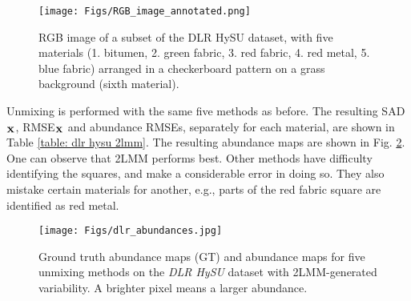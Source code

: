\begin{figure}[t]
    \centering
    \texttt{[image: Figs/RGB\_image\_annotated.png]}
    \caption{RGB image of a subset of the DLR HySU dataset, with five materials (1. bitumen, 2. green fabric, 3. red fabric, 4. red metal, 5. blue fabric) arranged in a checkerboard pattern on a grass background (sixth material).}
    \label{fig:dlr rgb}
\end{figure}

Unmixing is performed with the same five methods as before. The resulting SAD$_{\mathbf{X}}$, RMSE$_{\mathbf{X}}$ and abundance RMSEs, separately for each material, are shown in Table \ref{table: dlr hysu 2lmm}. The resulting abundance maps are shown in Fig. \ref{fig: dlr hysu abundances}. One can observe that 2LMM performs best. Other methods have difficulty identifying the squares, and make a considerable error in doing so. They also mistake certain materials for another, e.g., parts of the red fabric square are identified as red metal.

\begin{figure}[t]
    \centering
    \texttt{[image: Figs/dlr\_abundances.jpg]}
    \caption{Ground truth abundance maps (GT) and abundance maps for five unmixing methods on the \textit{DLR HySU} dataset with 2LMM-generated variability. A brighter pixel means a larger abundance.}
    \label{fig: dlr hysu abundances}
\end{figure}

